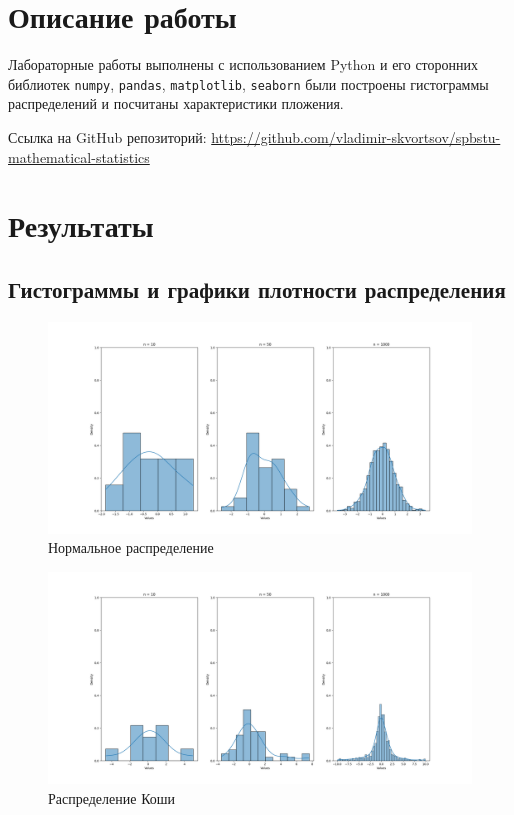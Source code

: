 \documentclass[12pt,a4paper]{article}
\begin{document}
	\section{Описание работы}
	Лабораторные работы выполнены с использованием Python и его сторонних библиотек \verb!numpy!, \verb!pandas!, \verb!matplotlib!, \verb!seaborn! были построены гистограммы распределений и посчитаны характеристики пложения.

	Ссылка на GitHub репозиторий: \href{https://github.com/vladimir-skvortsov/spbstu-mathematical-statistics}{https://github.com/vladimir-skvortsov/spbstu-mathematical-statistics}

	\newpage

	\section{Результаты}

	\subsection{Гистограммы и графики плотности распределения}

	\begin{figure}[h!]
		\begin{center}
			\includegraphics[width = 1.12\linewidth]{graphics/normal.png}
			\caption{Нормальное распределение}
		\end{center}
	\end{figure}

	\begin{figure}[h!]
		\begin{center}
			\includegraphics[width = 1.12\linewidth]{graphics/cauchy.png}
			\caption{Распределение Коши}
		\end{center}
	\end{figure}
\end{document}
